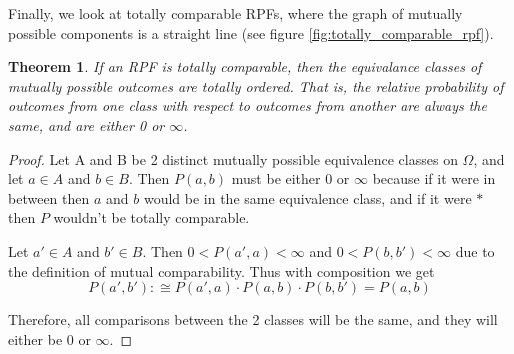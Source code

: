 \documentclass[twoside]{article}
\theoremstyle{plain}%
\newtheorem{theorem}{Theorem}[section]
\theoremstyle{definition}
\theoremstyle{remark}
\begin{document}
Finally, we look at totally comparable RPFs, where the graph of mutually possible components is a straight line (see figure \ref{fig:totally_comparable_rpf}).

\begin{theorem}
If an RPF is totally comparable, then the equivalance classes of mutually possible outcomes are \textit{totally ordered}. That is, the relative probability of outcomes from one class with respect to outcomes from another are always the same, and are either 0 or \(\infty\).
\end{theorem}

\begin{proof}
Let A and B be 2 distinct mutually possible equivalence classes on \(\Omega\), and let \(a \in A\) and \(b \in B\). Then \(P(a, b)\) must be either 0 or \(\infty\) because if it were in between then \(a\) and \(b\) would be in the same equivalence class, and if it were \(\ast\) then \(P\) wouldn't be totally comparable.

Let \(a' \in A\) and \(b' \in B\). Then \(0 < P(a', a) < \infty\) and \(0 < P(b, b') < \infty\) due to the definition of mutual comparability. Thus with composition we get
\[P(a', b') :\cong P(a', a) \cdot P(a, b) \cdot P(b, b') = P(a, b)\]

Therefore, all comparisons between the 2 classes will be the same, and they will either be 0 or \(\infty\).
\end{proof}
\end{document}
